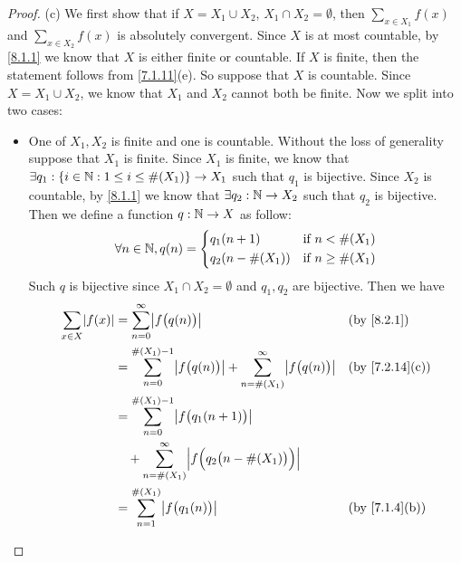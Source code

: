 \begin{proof}{(c)}
	We first show that if \(X = X_1 \cup X_2\), \(X_1 \cap X_2 = \emptyset\), then \(\sum_{x \in X_1} f(x)\) and \(\sum_{x \in X_2} f(x)\) is absolutely convergent.
	Since \(X\) is at most countable, by \cref{8.1.1} we know that \(X\) is either finite or countable.
	If \(X\) is finite, then the statement follows from \cref{7.1.11}(e).
	So suppose that \(X\) is countable.
	Since \(X = X_1 \cup X_2\), we know that \(X_1\) and \(X_2\) cannot both be finite.
	Now we split into two cases:
	\begin{itemize}
		\item One of \(X_1, X_2\) is finite and one is countable.
		      Without the loss of generality suppose that \(X_1\) is finite.
		      Since \(X_1\) is finite, we know that \(\exists q_1 : \left\lbrace i \in \mathbb{N} : 1 \leq i \leq \#(X_1)\right\rbrace \to X_1\) such that \(q_1\) is bijective.
		      Since \(X_2\) is countable, by \cref{8.1.1} we know that \(\exists q_2 : \mathbb{N} \to X_2\) such that \(q_2\) is bijective.
		      Then we define a function \(q : \mathbb{N} \to X\) as follow:
		      \[
			      \forall n \in \mathbb{N}, q(n) = \begin{dcases}
				      q_1(n + 1)       & \text{if } n < \#(X_1)    \\
				      q_2(n - \#(X_1)) & \text{if } n \geq \#(X_1)
			      \end{dcases}
		      \]
		      Such \(q\) is bijective since \(X_1 \cap X_2 = \emptyset\) and \(q_1, q_2\) are bijective.
		      Then we have
		      \begin{align*}
			      \sum_{x \in X} \abs{f(x)} & = \sum_{n = 0}^\infty \abs{f\big(q(n)\big)}                                                          &  & \by{8.2.1}                   \\
			                                & = \sum_{n = 0}^{\#(X_1) - 1} \abs{f\big(q(n)\big)} + \sum_{n = \#(X_1)}^\infty \abs{f\big(q(n)\big)} &  & \text{(by \cref{7.2.14}(c))} \\
			                                & = \sum_{n = 0}^{\#(X_1) - 1} \abs{f\big(q_1(n + 1)\big)}                                                                               \\
			                                & \quad + \sum_{n = \#(X_1)}^\infty \abs{f\Big(q_2\big(n - \#(X_1)\big)\Big)}                                                            \\
			                                & = \sum_{n = 1}^{\#(X_1)} \abs{f\big(q_1(n)\big)}                                                     &  & \text{(by \cref{7.1.4}(b))}  \\

\end{align*}
\end{itemize}
\end{proof}

